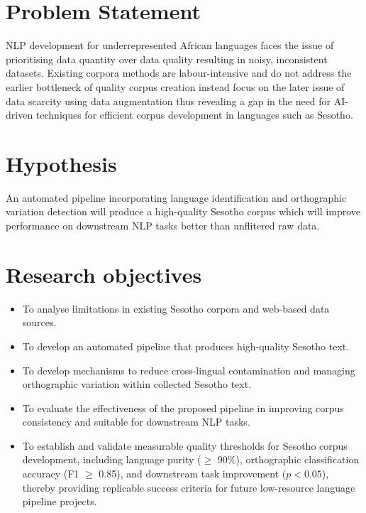 \documentclass[12pt]{ThesisRU}
\begin{document}
\section{Problem Statement}
NLP development for underrepresented African languages faces the issue of prioritising data quantity over data quality resulting in noisy, inconsistent datasets. Existing corpora methods are labour-intensive and do not address the earlier bottleneck of quality corpus creation instead focus on the later issue of data scarcity using data augmentation thus revealing a gap in the need for AI-driven techniques for efficient corpus development in languages such as Sesotho.

\section{Hypothesis}
An automated pipeline incorporating language identification and orthographic variation detection will produce a high-quality Sesotho corpus which will improve performance on downstream NLP tasks better than unflitered raw data.
\vspace{1em}
\section{Research objectives}
\begin{itemize}
        \item  To analyse limitations in existing Sesotho corpora and web-based data sources.
       \item 	To develop an automated pipeline that produces high-quality Sesotho text.
       \item To develop mechanisms to reduce cross-lingual contamination and managing orthographic variation within collected Sesotho text.
       \item To evaluate the effectiveness of the proposed pipeline in improving corpus consistency and suitable for downstream NLP tasks. 
       \item To establish and validate measurable quality thresholds for Sesotho corpus development, including language purity ($\geq$ 90\%), orthographic classification accuracy (F1 $\geq$ 0.85), and downstream task improvement ($p < 0.05$), thereby providing replicable success criteria for future low-resource language pipeline projects.
\end{itemize}
\vspace{1em}
\end{document}
